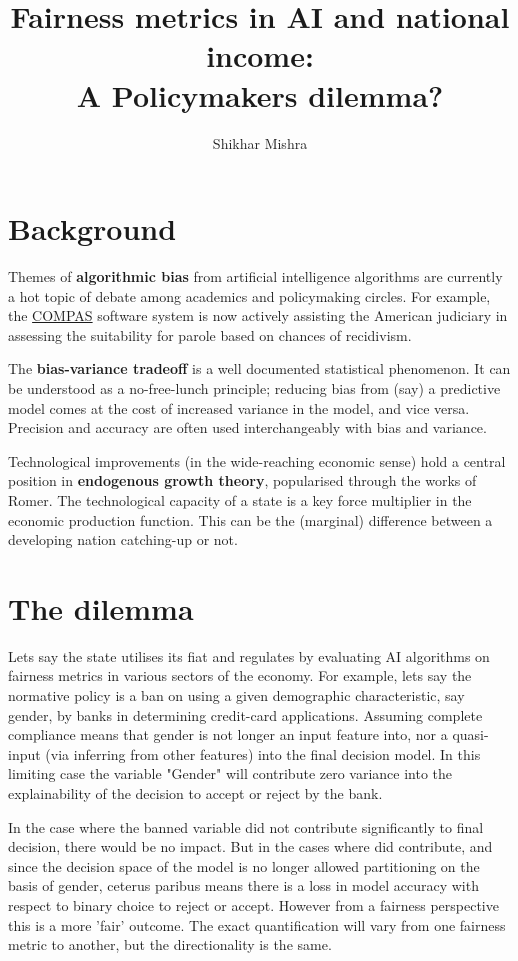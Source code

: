 \documentclass[11pt]{article}
\title{Fairness metrics in AI and national income: \\ A Policymakers dilemma?}
\author{Shikhar Mishra}
\begin{document}
\maketitle

\section{Background}

Themes of \textbf{algorithmic bias} from artificial intelligence algorithms are currently a hot topic of debate among academics and policymaking circles. For example, the \href{https://doc.wi.gov/Pages/AboutDOC/COMPAS.aspx}{COMPAS} software system is now actively assisting the American judiciary in assessing the suitability for parole based on chances of recidivism.

The \textbf{bias-variance tradeoff} is a well documented statistical phenomenon. It can be understood as a \textsc{}no-free-lunch\textsc{} principle;  reducing bias from (say) a predictive model comes at the cost of increased variance in the model, and vice versa. Precision and accuracy are often used interchangeably with bias and variance.

Technological improvements (in the wide-reaching economic sense) hold a central position in  \textbf{endogenous growth theory}, popularised through the works of Romer. The technological capacity of a state is a key force multiplier in the economic production function. This can be the (marginal) difference between a developing nation \textsc{}catching-up\textsc{} or not.


\section{The dilemma}
Lets say the state utilises its fiat and regulates by evaluating AI algorithms on fairness metrics in various sectors of the economy. For example, lets say the normative policy is a ban on using a given demographic characteristic, say gender, by banks in determining credit-card applications. Assuming complete compliance means that gender is not longer an input feature into, nor a quasi-input (via inferring from other features) into the final decision model. In this limiting case the variable "Gender" will contribute zero variance into the explainability of the decision to accept or reject by the bank.

In the case where the banned variable did not contribute significantly to final decision, there would be no impact. But in the cases where did contribute, and since the decision space of the model is no longer allowed partitioning on the basis of gender, ceterus paribus means there is a loss in model accuracy with respect to binary choice to reject or accept. However from a fairness perspective this is a more 'fair' outcome. The exact quantification will vary from one fairness metric to another, but the directionality is the same.
\end{document}
